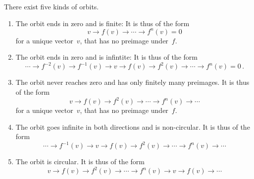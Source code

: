 \documentclass[a4paper,11pt]{scrartcl}
\begin{document}
There exist five kinds of orbits.
\begin{enumerate}[label = Type~\Alph*.]
  \item
    \label{finite nilpotent orbit}
    The orbit ends in zero and is finite:
    It is thus of the form
    \[
      v
      \to
      f(v)
      \to
      \dotsb
      \to
      f^n(v)
      =
      0
    \]
    for a unique vector~$v$, that has no preimage under~$f$.
  \item
    \label{infinite nilpotent orbit}
    The orbit ends in zero and is infintite:
    It is thus of the form
    \[
      \dotsb
      \to
      f^{-2}(v)
      \to
      f^{-1}(v)
      \to
      v
      \to
      f(v)
      \to
      f^2(v)
      \to
      \dotsb
      \to
      f^n(v)
      =
      0 \,.
    \]
  \item
    \label{infinite onesided}
    The orbit never reaches zero and has only finitely many preimages.
    It is thus of the form
    \[
      v
      \to
      f(v)
      \to
      f^2(v)
      \to
      \dotsb
      \to
      f^n(v)
      \to
      \dotsb
    \]
    for a unique vector~$v$, that has no preimage under~$f$.
  \item
    \label{infinite twosided orbit}
    The orbit goes infinite in both directions and is non-circular.
    It is thus of the form
    \[
      \dotsb
      \to
      f^{-1}(v)
      \to
      v
      \to
      f(v)
      \to
      f^2(v)
      \to
      \dotsb
      \to
      f^n(v)
      \to
      \dotsb
    \]
  \item
    \label{circle orbit}
    The orbit is circular.
    It is thus of the form
    \[
      v
      \to
      f(v)
      \to
      f^2(v)
      \to
      \dotsb
      \to
      f^n(v)
      \to
      v
      \to
      f(v)
      \to
      \dotsb
    \]
\end{enumerate}
\end{document}
